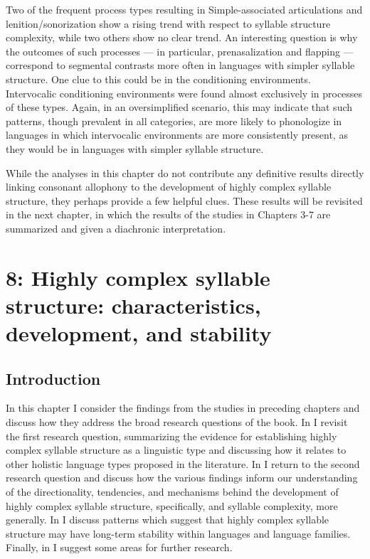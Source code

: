   Two of the frequent process types resulting in Simple-associated articulations and lenition/sonorization show a rising trend with respect to syllable structure complexity, while two others show no clear trend. An interesting question is why the outcomes of such processes — in particular, prenasalization and flapping — correspond to segmental contrasts more often in languages with simpler syllable structure. One clue to this could be in the conditioning environments. Intervocalic conditioning environments were found almost exclusively in processes of these types. Again, in an oversimplified scenario, this may indicate that such patterns, though prevalent in all categories, are more likely to phonologize in languages in which intervocalic environments are more consistently present, as they would be in languages with simpler syllable structure.

  While the analyses in this chapter do not contribute any definitive results directly linking consonant allophony to the development of highly complex syllable structure, they perhaps provide a few helpful clues. These results will be revisited in the next chapter, in which the results of the studies in Chapters 3-7 are summarized and given a diachronic interpretation.

\chapter{8: Highly complex syllable structure: characteristics, development, and stability}\label{sec:8}
\section{Introduction}\label{sec:8.1}

  In this chapter I consider the findings from the studies in preceding chapters and discuss how they address the broad research questions of the book. In  I revisit the first research question, summarizing the evidence for establishing highly complex syllable structure as a linguistic type and discussing how it relates to other holistic language types proposed in the literature. In  I return to the second research question and discuss how the various findings inform our understanding of the directionality, tendencies, and mechanisms behind the development of highly complex syllable structure, specifically, and syllable complexity, more generally. In  I discuss patterns which suggest that highly complex syllable structure may have long-term stability within languages and language families. Finally, in  I suggest some areas for further research.

